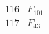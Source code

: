 \documentclass{article}
\begin{document}
{$$\begin{array}{|r|*{7}{r|}}
 & 
 & 
 & 
 & 
\\
\hline
116 
 & F_{101} &
 & 
 & 
 & 
 & 
 & 
\\
\hline
117 
 & F_{43} &
 & 
 & 
 & 
 & 
 & 

\end{array}$$}
\end{document}
